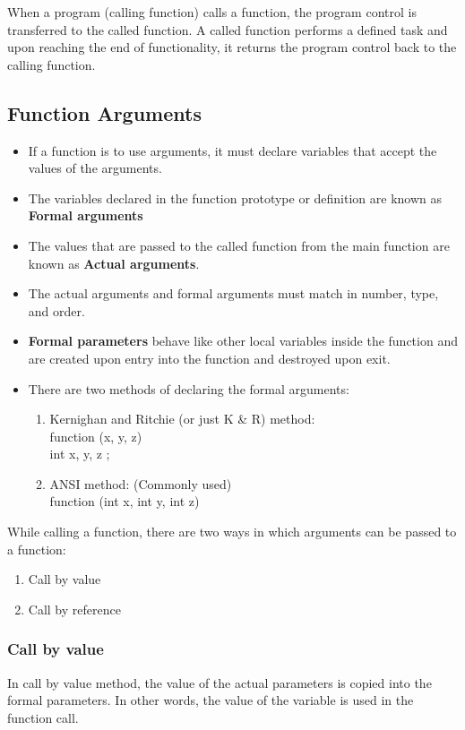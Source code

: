 When a program (calling function) calls a function, the program control is transferred to the called function. A called function performs a defined task and upon reaching the end of functionality, it returns the program control back to the calling function.

\subsection{Function Arguments}
\begin{itemize}
    \item If a function is to use arguments, it must declare variables that accept the values of the arguments. 
    \item The variables declared in the function prototype or definition are known as \textbf{Formal arguments}
    \item The values that are passed to the called function from the main function are known as \textbf{Actual arguments}.
    \item The actual arguments and formal arguments must match in number, type, and order.
    \item \textbf{Formal parameters} behave like other local variables inside the function and are created upon entry into the function and destroyed upon exit.
    \item There are two methods of declaring the formal arguments: 
    \begin{enumerate}
        \item Kernighan and Ritchie (or just K \& R) method:\\ 
        function (x, y, z)\\
        int x, y, z ;
        \item ANSI method: (Commonly used)\\
        function (int x, int y, int z)
    \end{enumerate}
\end{itemize}

While calling a function, there are two ways in which arguments can be passed to a function:
\begin{enumerate}
    \item Call by value
    \item Call by reference
\end{enumerate}

\subsubsection{Call by value}
In call by value method, the value of the actual parameters is copied into the formal parameters. In other words, the value of the variable is used in the function call.

